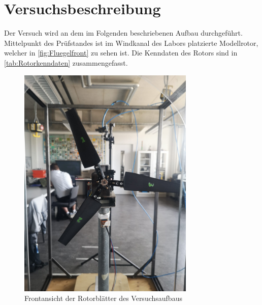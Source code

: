 \section{Versuchsbeschreibung}
\label{section:Versuchsbeschreibung}
Der Versuch wird an dem im Folgenden beschriebenen Aufbau durchgeführt.\\
Mittelpunkt des Prüfstandes ist im Windkanal des Labors platzierte Modellrotor, welcher in \autoref{fig:Fluegelfront}
zu sehen ist. Die Kenndaten des Rotors sind in \autoref{tab:Rotorkenndaten} zusammengefasst.
\begin{figure}[H]
    \centering
    \includegraphics[width=0.75\textwidth]{Abbildungen/Fluegelfront.jpeg}
    \caption{Frontansicht der Rotorblätter des Versuchsaufbaus}
    \label{fig:Fluegelfront}
\end{figure}


